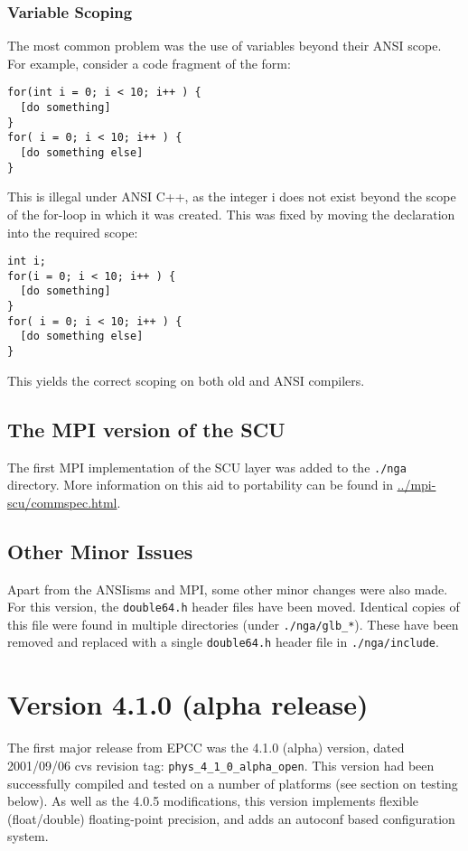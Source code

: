 \documentclass[12pt]{article}
\newcommand{\cde}[1]{{\tt #1}}            %
\begin{document}
\subsubsection{Variable Scoping}
The most common problem was the use of variables beyond their ANSI scope.  For
example, consider a code fragment of the form:
\begin{verbatim}
for(int i = 0; i < 10; i++ ) {
  [do something]
}
for( i = 0; i < 10; i++ ) {
  [do something else]
}
\end{verbatim}
This is illegal under ANSI C++, as the integer i does not exist beyond the
scope of the for-loop in which it was created.  This was fixed by moving the
declaration into the required scope:
\begin{verbatim}
int i;
for(i = 0; i < 10; i++ ) {
  [do something]
}
for( i = 0; i < 10; i++ ) {
  [do something else]
}
\end{verbatim}
This yields the correct scoping on both old and ANSI compilers.

\subsection{The MPI version of the SCU}
The first MPI implementation of the SCU layer was added to
the \cde{./nga} directory.  More information on this aid to portability can be found
in \href{../mpi-scu/commspec.html}{../mpi-scu/commspec.html}.

\subsection{Other Minor Issues}
Apart from the ANSIisms and MPI, some other minor changes were also made.  For
this version, the \cde{double64.h} header files have been moved.  Identical
copies of this file were found in multiple directories (under
\cde{./nga/glb\_*}).  These have been removed and replaced with a single
\cde{double64.h} header file in \cde{./nga/include}.


\section{Version 4.1.0 (alpha release)}
The first major release from EPCC was the 4.1.0 (alpha) version, dated
2001/09/06 cvs revision tag: \cde{phys\_4\_1\_0\_alpha\_open}.  This version
had been successfully compiled and tested on a number of platforms (see
section on testing below).  As well as the 4.0.5 modifications, this version
implements flexible (float/double) floating-point precision, and adds an
autoconf based configuration system.
\end{document}
